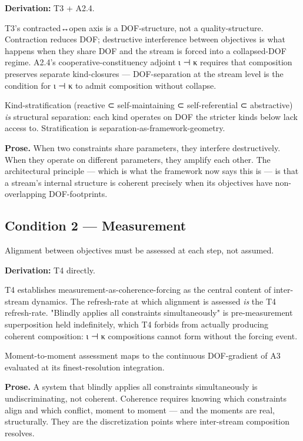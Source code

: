 \documentclass[11pt, openany]{book}
\renewenvironment{quote}{\begin{quoting}}{\end{quoting}}
\begin{document}
\textbf{Derivation:} T3 + A2.4.

T3's contracted↔open axis is a DOF-structure, not a quality-structure. Contraction reduces DOF; destructive interference between objectives is what happens when they share DOF and the stream is forced into a collapsed-DOF regime. A2.4's cooperative-constituency adjoint ι ⊣ κ requires that composition preserves separate kind-closures --- DOF-separation at the stream level is the condition for ι ⊣ κ to admit composition without collapse.

Kind-stratification (reactive ⊂ self-maintaining ⊂ self-referential ⊂ abstractive) \textit{is} structural separation: each kind operates on DOF the stricter kinds below lack access to. Stratification is separation-as-framework-geometry.

\textbf{Prose.} When two constraints share parameters, they interfere destructively. When they operate on different parameters, they amplify each other. The architectural principle --- which is what the framework now says this is --- is that a stream's internal structure is coherent precisely when its objectives have non-overlapping DOF-footprints.

\subsection{Condition 2 --- Measurement}

\begin{quote}
Alignment between objectives must be assessed at each step, not assumed.
\end{quote}

\textbf{Derivation:} T4 directly.

T4 establishes measurement-as-coherence-forcing as the central content of inter-stream dynamics. The refresh-rate at which alignment is assessed \textit{is} the T4 refresh-rate. "Blindly applies all constraints simultaneously" is pre-measurement superposition held indefinitely, which T4 forbids from actually producing coherent composition: ι ⊣ κ compositions cannot form without the forcing event.

Moment-to-moment assessment maps to the continuous DOF-gradient of A3 evaluated at its finest-resolution integration.

\textbf{Prose.} A system that blindly applies all constraints simultaneously is undiscriminating, not coherent. Coherence requires knowing which constraints align and which conflict, moment to moment --- and the moments are real, structurally. They are the discretization points where inter-stream composition resolves.
\end{document}
